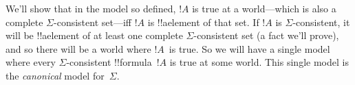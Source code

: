 \documentclass[../../../include/open-logic-section]{subfiles}
\begin{document}
We'll show that in the model so defined, $!A$ is true at a
world---which is also a complete $\Sigma$-consistent set---iff $!A$ is
!!a{element} of that set.  If $!A$ is $\Sigma$-consistent, it will be
!!a{element} of at least one complete $\Sigma$-consistent set (a fact
we'll prove), and so there will be a world where $!A$~is true. So we
will have a single model where every $\Sigma$-consistent
!!{formula}~$!A$ is true at some world.  This single model is the
\emph{canonical} model for~$\Sigma$.
\end{document}
